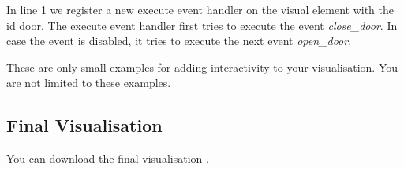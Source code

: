 In line 1 we register a new execute event handler on the visual element with the id door.
The execute event handler first tries to execute the event \textit{close\_door}.
In case the event is disabled, it tries to execute the next event \textit{open\_door}.

These are only small examples for adding interactivity to your visualisation.
You are not limited to these examples.

\subsection{Final Visualisation}

You can download the final visualisation .
